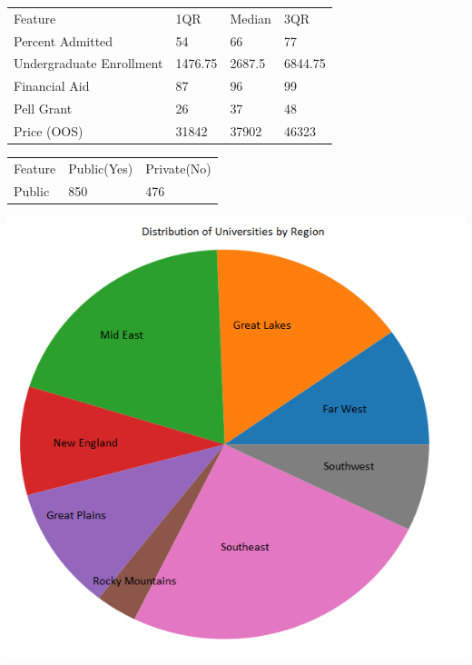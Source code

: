 \documentclass[12pt, a4, epsf] {article}
\theoremstyle{plain}
\theoremstyle{definition}
\begin{document}
\begin{table}[htbp]
\begin{tabular}{llll}
Feature                  & 1QR     & Median & 3QR     \\
Percent Admitted         & 54      & 66     & 77      \\
Undergraduate Enrollment & 1476.75 & 2687.5 & 6844.75 \\
Financial Aid            & 87      & 96     & 99      \\
Pell Grant               & 26      & 37     & 48      \\
Price (OOS)              & 31842   & 37902  & 46323  
\end{tabular}
\end{table}
\begin{table}[htbp]
\begin{tabular}{lll}
Feature       & Public(Yes) & Private(No) \\
Public & 850    & 476    
\end{tabular}
\end{table}
\includegraphics[width = 1.0\textwidth]{Region_Pie_Chart.png}
\FloatBarrier
\end{document}
